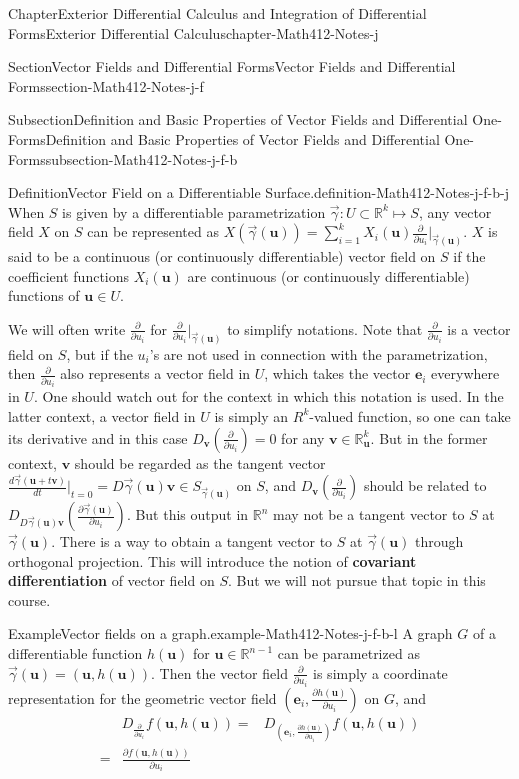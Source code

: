 \documentclass[oneside,10pt,]{book}
\newcommand{\terminology}[1]{\textbf{#1}}
\numberwithin{equation}{section}
\newcommand{\be}{\mathbf{e}}
\newcommand{\bu}{\mathbf{u}}
\newcommand{\bv}{\mathbf{v}}
\newcommand{\bbR}{\mathbb{R}}
\newcommand{\vg}{{\vec{\gamma}}}
\newcommand{\amp}{&}
\begin{document}
\begin{chapterptx}{Chapter}{Exterior Differential Calculus and Integration of Differential Forms}{}{Exterior Differential Calculus}{}{}{chapter-Math412-Notes-j}
\begin{sectionptx}{Section}{Vector Fields and Differential Forms}{}{Vector Fields and Differential Forms}{}{}{section-Math412-Notes-j-f}
\begin{subsectionptx}{Subsection}{Definition and Basic Properties of Vector Fields and Differential One-Forms}{}{Definition and Basic Properties of Vector Fields and Differential One-Forms}{}{}{subsection-Math412-Notes-j-f-b}
\begin{definition}{Definition}{Vector Field on a Differentiable Surface.}{definition-Math412-Notes-j-f-b-j}
When \(S\) is given by a differentiable parametrization \(\vg :U\subset \bbR^{k}\mapsto S\), any vector field \(X\) on \(S\) can be represented as \(X(\vg(\bu))=\sum_{i=1}^{k} X_{i}(\bu)  \frac{\partial }{\partial u_{i}}\Big|_{\vg(\bu)}.\) \(X\) is said to be a continuous (or continuously differentiable) vector field on \(S\) if the coefficient functions \(X_{i}(\bu)\) are continuous (or continuously differentiable) functions of \(\bu \in U\).%
\end{definition}
We will often write \(\frac{\partial }{\partial u_{i}}\) for \(\frac{\partial }{\partial u_{i}}\Big|_{\vg(\bu)}\) to simplify notations. Note that \(\frac{\partial }{\partial u_{i}}\) is a vector field on \(S\), but if the \(u_{i}\)'s are not used in connection with the parametrization, then \(\frac{\partial }{\partial u_{i}}\) also represents a vector field in \(U\), which takes the vector \(\be_{i}\) everywhere in \(U\). One should watch out for the context in which this notation is used. In the latter context, a vector field in \(U\) is simply an \(R^{k}\)-valued function, so one can take its derivative and in this case \(D_{\bv}\left(\frac{\partial }{\partial u_{i}}\right)=0\) for any \(\bv\in \bbR^{k}_{\bu}\). But in the former context, \(\bv\) should be regarded as the tangent vector \(\frac{d \vg(\bu+t\bv)}{dt}\Big|_{t=0}=D\vg(\bu)\bv \in S_{\vg(\bu)}\) on \(S\), and \(D_{\bv}\left(\frac{\partial }{\partial u_{i}}\right)\) should be related to \(D_{D\vg(\bu)\bv}\left(\frac{\partial \vg(\bu)}{\partial u_{i}}\right)\). But this output in \(\bbR^{n}\) may not be a tangent vector to \(S\) at \(\vg(\bu)\). There is a way to obtain a tangent vector to \(S\) at \(\vg(\bu)\) through orthogonal projection. This will introduce the notion of \terminology{covariant differentiation} of vector field on \(S\). But we will not pursue that topic in this course.%
\begin{example}{Example}{Vector fields on a graph.}{example-Math412-Notes-j-f-b-l}%
A  graph \(G\) of a differentiable function \(h(\bu)\) for \(\bu \in \bbR^{n-1}\) can be parametrized as \(\vg (\bu)=(\bu, h(\bu))\). Then the vector field \(\frac{\partial  }{\partial u_{i}}\) is simply a coordinate representation for the geometric vector field \((\mathbf e_{i}, \frac{\partial h(\bu) }{\partial u_{i}})\) on \(G\), and%
\begin{align*}
\amp D_{\frac{\partial  }{\partial u_{i}}}f (\bu, h(\bu))=\amp
D_{(\mathbf e_{i}, \frac{\partial h(\bu) }{\partial u_{i}})}f(\bu, h(\bu))\\
=\amp \frac{\partial f(\bu, h(\bu) )}{\partial u_{i}}

\end{align*}
\end{example}
\end{subsectionptx}
\end{sectionptx}
\end{chapterptx}
\end{document}

